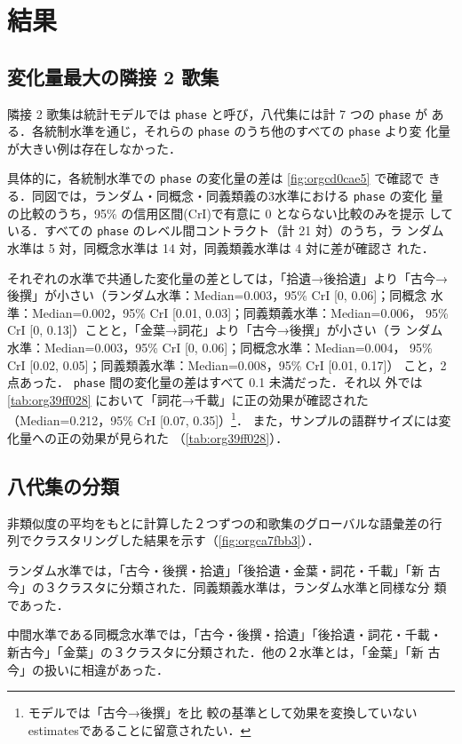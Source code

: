 \documentclass[submit]{ipsj}
\renewcommand{\ref}{\cref}
\begin{document}
\section{結果\label{orge087dd4}}
\label{sec:orgf674e8d}
\subsection{変化量最大の隣接 2 歌集\label{orgf557cae}}
\label{sec:org8a8960d}
隣接 2 歌集は統計モデルでは \texttt{phase} と呼び，八代集には計 7 つの \texttt{phase} が
ある．各統制水準を通じ，それらの \texttt{phase} のうち他のすべての \texttt{phase} より変
化量が大きい例は存在しなかった．

具体的に，各統制水準での \texttt{phase} の変化量の差は \ref{fig:orgcd0cae5} で確認で
きる．同図では，ランダム・同概念・同義類義の3水準における \texttt{phase} の変化
量の比較のうち，95\% の信用区間(CrI)で有意に 0 とならない比較のみを提示
している．すべての \texttt{phase} のレベル間コントラクト（計 21 対）のうち，ラ
ンダム水準は 5 対，同概念水準は 14 対，同義類義水準は 4 対に差が確認さ
れた．

それぞれの水準で共通した変化量の差としては，「拾遺→後拾遺」より「古今→
後撰」が小さい（ランダム水準：Median=0.003，95\% CrI [0, 0.06]；同概念
水準：Median=0.002，95\% CrI [0.01, 0.03]；同義類義水準：Median=0.006，
95\% CrI [0, 0.13]）ことと，「金葉→詞花」より「古今→後撰」が小さい（ラ
ンダム水準：Median=0.003，95\% CrI [0, 0.06]；同概念水準：Median=0.004，
95\% CrI [0.02, 0.05]；同義類義水準：Median=0.008，95\% CrI [0.01, 0.17]）
こと，2点あった． \texttt{phase} 間の変化量の差はすべて 0.1 未満だった．それ以
外では\ref{tab:org39ff028} において「詞花→千載」に正の効果が確認された
（Median=0.212，95\% CrI [0.07, 0.35]）\footnote{モデルでは「古今→後撰」を比
較の基準として効果を変換していないestimatesであることに留意されたい．}．
また，サンプルの語群サイズには変化量への正の効果が見られた
（\ref{tab:org39ff028}）．
\subsection{八代集の分類\label{orgb1299cc}}
\label{sec:org4b9135e}
非類似度の平均をもとに計算した２つずつの和歌集のグローバルな語彙差の行
列でクラスタリングした結果を示す（\ref{fig:orgca7fbb3}）．

ランダム水準では，「古今・後撰・拾遺」「後拾遺・金葉・詞花・千載」「新
古今」の３クラスタに分類された．同義類義水準は，ランダム水準と同様な分
類であった．

中間水準である同概念水準では，「古今・後撰・拾遺」「後拾遺・詞花・千載・
新古今」「金葉」の３クラスタに分類された．他の２水準とは，「金葉」「新
古今」の扱いに相違があった．
\end{document}
